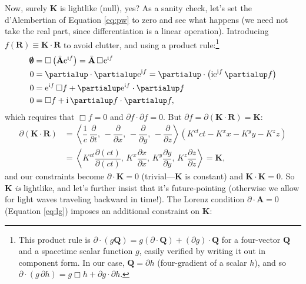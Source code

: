 \documentclass[12pt]{article}
\renewcommand{\vv}[1]{\mathbf{#1}}
\begin{document}
Now, surely $\vv K$ is lightlike (null), yes? As a sanity check, let's set the d'Alembertian of Equation \ref{eq:pw} to zero and see what happens (we need not take the real part, since differentiation is a linear operation). Introducing $f(\vv R) \equiv \vv K \cdot \vv R$ to avoid clutter, and using a product rule:\footnote{This product rule is $\partialup \cdot (g \vv Q) = g (\partialup \cdot \vv Q) + (\partialup g) \cdot \vv Q$ for a four-vector $\vv Q$ and a spacetime scalar function $g$, easily verified by writing it out in component form. In our case, $\vv Q = \partialup h$ (four-gradient of a scalar $h$), and so $\partialup \cdot (g \, \partialup h) = g \Box h + \partialup g \cdot \partialup h$.}
\begin{equation*}
\begin{aligned}
\textrm{\mbox{\boldmath $\emptyset$}} &= \Box \left( \bar{\vv A} \mathrm{e}^{\mathrm{i} f} \right) = \bar{\vv A} \, \Box \mkern1mu \mathrm{e}^{\mathrm{i} f} \\
0 &= \partialup \cdot \partialup \mathrm{e}^{\mathrm{i} f} = \partialup \cdot \left( \mathrm{i} \mathrm{e}^{\mathrm{i} f} \, \partialup f \right) \\
0 &= \mathrm{e}^{\mathrm{i} f} \, \Box f + \partialup \mathrm{e}^{\mathrm{i} f} \cdot \partialup f  \\
0 &=  \Box f + \mathrm{i} \, \partialup f \cdot \partialup f ,
\end{aligned}
\end{equation*}
which requires that $\Box f = 0$ and $\partialup f \cdot \partialup f = 0$. But $\partialup f = \partialup (\vv K \cdot \vv R) = \vv K$:
\begin{equation*}
\begin{aligned}
\partialup (\vv K \cdot \vv R) &= \left \langle \dfrac{1}{c} \, \dfrac{\partial}{\partial t}, \, - \dfrac{\partial}{\partial x}, \, - \dfrac{\partial}{\partial y}, \, - \dfrac{\partial}{\partial z} \right \rangle \left( K^{ct} ct - K^x x - K^y y - K^z z \right) \\[3pt]
&= \left \langle K^{ct} \dfrac{\partial (ct)}{\partial (ct)}, \, K^x \dfrac{\partial x}{\partial x}, \, K^y \dfrac{\partial y}{\partial y} , \, K^z \dfrac{\partial z}{\partial z} \right \rangle = \vv K ,
\end{aligned}
\end{equation*}
and our constraints become $\partialup \cdot \vv K = 0$ (trivial---$\vv K$ is constant) and $\vv K \cdot \vv K = 0$. So $\vv K$ \emph{is} lightlike, and let's further insist that it's future-pointing (otherwise we allow for light waves traveling backward in time!). The Lorenz condition $\partialup \cdot \vv A = 0$ (Equation \ref{eq:lg}) imposes an additional constraint on $\vv K$:
\end{document}
